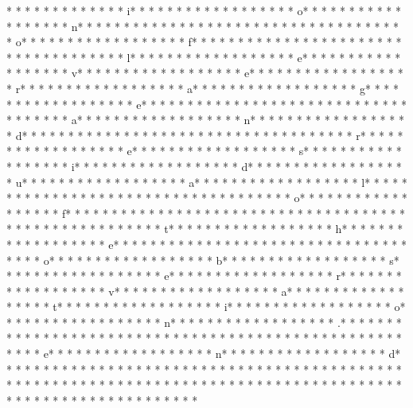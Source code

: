 *  * * *  *  * * *  *  * * *  * i* * *  * * *  * * *  *  * * *  *  * * *  * o* * *  * * *  * * *  *  * * *  *  * * *  * n* * *  * * *  * * *  *  * * *  *  * * *  *  * * *  * * *  * * *  *  * * *  *  * * *  * o* * *  * * *  * * *  *  * * *  *  * * *  * f* * *  * * *  * * *  *  * * *  *  * * *  *  * * *  * * *  * * *  *  * * *  *  * * *  * l* * *  * * *  * * *  *  * * *  *  * * *  * e* * *  * * *  * * *  *  * * *  *  * * *  * v* * *  * * *  * * *  *  * * *  *  * * *  * e* * *  * * *  * * *  *  * * *  *  * * *  * r* * *  * * *  * * *  *  * * *  *  * * *  * a* * *  * * *  * * *  *  * * *  *  * * *  * g* * *  * * *  * * *  *  * * *  *  * * *  * e* * *  * * *  * * *  *  * * *  *  * * *  *  * * *  * * *  * * *  *  * * *  *  * * *  * a* * *  * * *  * * *  *  * * *  *  * * *  * n* * *  * * *  * * *  *  * * *  *  * * *  * d* * *  * * *  * * *  *  * * *  *  * * *  *  * * *  * * *  * * *  *  * * *  *  * * *  * r* * *  * * *  * * *  *  * * *  *  * * *  * e* * *  * * *  * * *  *  * * *  *  * * *  * s* * *  * * *  * * *  *  * * *  *  * * *  * i* * *  * * *  * * *  *  * * *  *  * * *  * d* * *  * * *  * * *  *  * * *  *  * * *  * u* * *  * * *  * * *  *  * * *  *  * * *  * a* * *  * * *  * * *  *  * * *  *  * * *  * l* * *  * * *  * * *  *  * * *  *  * * *  *  * * *  * * *  * * *  *  * * *  *  * * *  * o* * *  * * *  * * *  *  * * *  *  * * *  * f* * *  * * *  * * *  *  * * *  *  * * *  *  * * *  * * *  * * *  *  * * *  *  * * *  * 
* * *  * * *  * * *  *  * * *  *  * * *  * t* * *  * * *  * * *  *  * * *  *  * * *  * h* * *  * * *  * * *  *  * * *  *  * * *  * e* * *  * * *  * * *  *  * * *  *  * * *  *  * * *  * * *  * * *  *  * * *  *  * * *  * o* * *  * * *  * * *  *  * * *  *  * * *  * b* * *  * * *  * * *  *  * * *  *  * * *  * s* * *  * * *  * * *  *  * * *  *  * * *  * e* * *  * * *  * * *  *  * * *  *  * * *  * r* * *  * * *  * * *  *  * * *  *  * * *  * v* * *  * * *  * * *  *  * * *  *  * * *  * a* * *  * * *  * * *  *  * * *  *  * * *  * t* * *  * * *  * * *  *  * * *  *  * * *  * i* * *  * * *  * * *  *  * * *  *  * * *  * o* * *  * * *  * * *  *  * * *  *  * * *  * n* * *  * * *  * * *  *  * * *  *  * * *  * .* * *  * * *  * * *  *  * * *  *  * * *  *  * * *  * * *  * * *  *  * * *  *  * * *  * 
* * *  * * *  * * *  *  * * *  *  * * *  * e* * *  * * *  * * *  *  * * *  *  * * *  * n* * *  * * *  * * *  *  * * *  *  * * *  * d* * *  * * *  * * *  *  * * *  *  * * *  * {* * *  * * *  * * *  *  * * *  *  * * *  *  * * *  * * *  * * *  *  * * *  *  * * *  * }* * *  * * *  * * *  *  * * *  *  * * *  * 
* * *  * * *  * * *  *  * * *  *  * * *  * 
* * *  * * *  * * *  *  * * *  *  * * *  * 
